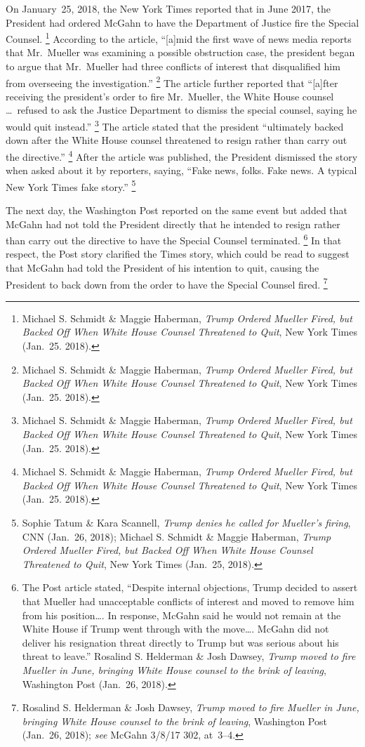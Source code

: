 On January~25, 2018, the New York Times reported that in June 2017, the President had ordered McGahn to have the Department of Justice fire the Special Counsel.%
\footnote{Michael S. Schmidt \& Maggie Haberman, \textit{Trump Ordered Mueller Fired, but Backed Off When White House Counsel Threatened to Quit}, New York Times (Jan.~25. 2018).}
According to the article, ``[a]mid the first wave of news media reports that Mr.~Mueller was examining a possible obstruction case, the president began to argue that Mr.~Mueller had three conflicts of interest that disqualified him from overseeing the investigation.''%
\footnote{Michael S. Schmidt \& Maggie Haberman, \textit{Trump Ordered Mueller Fired, but Backed Off When White House Counsel Threatened to Quit}, New York Times (Jan.~25. 2018).}
The article further reported that ``[a]fter receiving the president's order to fire Mr.~Mueller, the White House counsel \dots\ refused to ask the Justice Department to dismiss the special counsel, saying he would quit instead.''%
\footnote{Michael S. Schmidt \& Maggie Haberman, \textit{Trump Ordered Mueller Fired, but Backed Off When White House Counsel Threatened to Quit}, New York Times (Jan.~25. 2018).}
The article stated that the president ``ultimately backed down after the White House counsel threatened to resign rather than carry out the directive.''%
\footnote{Michael S. Schmidt \& Maggie Haberman, \textit{Trump Ordered Mueller Fired, but Backed Off When White House Counsel Threatened to Quit}, New York Times (Jan.~25. 2018).}
After the article was published, the President dismissed the story when asked about it by reporters, saying, ``Fake news, folks.
Fake news.
A typical New York Times fake story.''%
\footnote{Sophie Tatum \& Kara Scannell, \textit{Trump denies he called for Mueller's firing}, CNN (Jan.~26, 2018);
Michael S. Schmidt \& Maggie Haberman, \textit{Trump Ordered Mueller Fired, but Backed Off When White House Counsel Threatened to Quit}, New York Times (Jan.~25, 2018).}

The next day, the Washington Post reported on the same event but added that McGahn had not told the President directly that he intended to resign rather than carry out the directive to have the Special Counsel terminated.%
\footnote{The Post article stated, ``Despite internal objections, Trump decided to assert that Mueller had unacceptable conflicts of interest and moved to remove him from his position\dots.
In response, McGahn said he would not remain at the White House if Trump went through with the move\dots.
McGahn did not deliver his resignation threat directly to Trump but was serious about his threat to leave.''
Rosalind S. Helderman \& Josh Dawsey, \textit{Trump moved to fire Mueller in June, bringing White House counsel to the brink of leaving}, Washington Post (Jan.~26, 2018).}
In that respect, the Post story clarified the Times story, which could be read to suggest that McGahn had told the President of his intention to quit, causing the President to back down from the order to have the Special Counsel fired.%
\footnote{Rosalind S. Helderman \& Josh Dawsey, \textit{Trump moved to fire Mueller in June, bringing White House counsel to the brink of leaving}, Washington Post (Jan.~26, 2018);
\textit{see} McGahn 3/8/17 302, at~3--4.}

